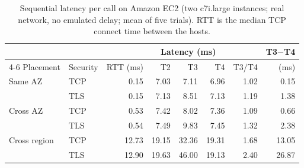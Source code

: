 \begin{table}[t]
\centering
\caption{Sequential latency per call on Amazon EC2 (two c7i.large instances; real network, no emulated delay; mean of five trials). RTT is the median TCP connect time between the hosts.}
\label{tab:aws-latency}
\footnotesize
\setlength{\tabcolsep}{2.7pt}
\begin{tabular}{ll r rrr r r}
\toprule
 & & & \multicolumn{3}{c}{Latency (ms)} & & T3$-$T4 \\
\cmidrule(lr){4-6}
Placement & Security & RTT (ms) & T2 & T3 & T4 & T3/T4 & (ms) \\
\midrule
Same AZ & TCP & 0.15 & 7.03 & 7.11 & 6.96 & 1.02 & 0.15 \\
 & TLS & 0.15 & 7.13 & 8.51 & 7.13 & 1.19 & 1.38 \\
\addlinespace
Cross AZ & TCP & 0.53 & 7.42 & 8.02 & 7.36 & 1.09 & 0.66 \\
 & TLS & 0.54 & 7.49 & 9.83 & 7.45 & 1.32 & 2.38 \\
\addlinespace
Cross region & TCP & 12.73 & 19.15 & 32.36 & 19.31 & 1.68 & 13.05 \\
 & TLS & 12.90 & 19.63 & 46.00 & 19.13 & 2.40 & 26.87 \\
\bottomrule
\end{tabular}
\end{table}
